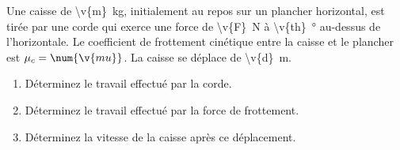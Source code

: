 Une caisse de \qty{\v{m}}{kg}, initialement au repos sur un plancher horizontal, est tirée par une corde qui exerce une force de \qty{\v{F}}{N} à \qty{\v{th}}{\degree} au-dessus de l'horizontale. Le coefficient de frottement cinétique entre la caisse et le plancher est $\mu_c = \num{\v{mu}}$. La caisse se déplace de \qty{\v{d}}{m}.

\begin{enumerate}[label=\alph*)]
    \item Déterminez le travail effectué par la corde.
    \item Déterminez le travail effectué par la force de frottement.
    \item Déterminez la vitesse de la caisse après ce déplacement.
\end{enumerate}
